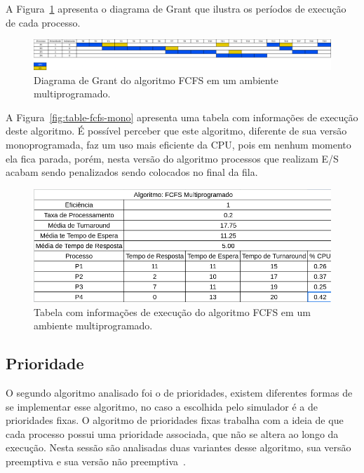 \documentclass[
	12pt,				%
	oneside,   	        %
	a4paper,			%
	english,			%
	french,				%
	spanish,			%
	brazil,				%
	]{pacotes/abntex2}
\begin{document}
A Figura~\ref{fig:fcfs-multi} apresenta o diagrama de Grant que ilustra os períodos de execução de cada processo.

\begin{figure}[H]
  \centering
  \includegraphics[scale=0.20]{figuras/ex1/fifo-multi.png}
  \caption{Diagrama de Grant do algoritmo FCFS em um ambiente multiprogramado.}
  \label{fig:fcfs-multi}
\end{figure}

A Figura~\ref{fig:table-fcfs-mono} apresenta uma tabela com informações de execução deste algoritmo. É possível perceber que este algoritmo, diferente de sua versão monoprogramada, faz um uso mais eficiente da CPU, pois em nenhum momento ela fica parada, porém, nesta versão do algoritmo processos que realizam E/S acabam sendo penalizados sendo colocados no final da fila.

\begin{figure}[H]
  \centering
  \includegraphics[scale=0.5]{figuras/ex1/table-fifo-multi.png}
  \caption{Tabela com informações de execução do algoritmo FCFS em um ambiente multiprogramado.}
  \label{fig:table-fcfs-multi}
\end{figure}

\subsection{Prioridade}
\label{subsec:prio}

O segundo algoritmo analisado foi o de prioridades, existem diferentes formas de se implementar esse algoritmo, no caso a escolhida pelo simulador é a de prioridades fixas. O algoritmo de prioridades fixas trabalha com a ideia de que cada processo possui uma prioridade associada, que não se altera ao longo da execução. Nesta sessão são analisadas duas variantes desse algoritmo, sua versão preemptiva e sua versão não preemptiva~\cite{maziero2019}.
\end{document}
